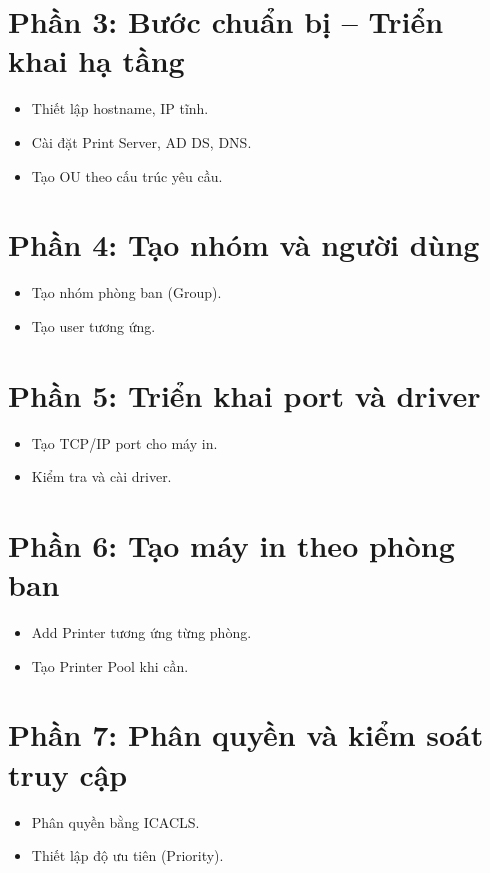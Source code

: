 
\section*{Phần 3: Bước chuẩn bị – Triển khai hạ tầng}
\begin{itemize}
    \item Thiết lập hostname, IP tĩnh.
    \item Cài đặt Print Server, AD DS, DNS.
    \item Tạo OU theo cấu trúc yêu cầu.
\end{itemize}

\section*{Phần 4: Tạo nhóm và người dùng}
\begin{itemize}
    \item Tạo nhóm phòng ban (Group).
    \item Tạo user tương ứng.
\end{itemize}

\section*{Phần 5: Triển khai port và driver}
\begin{itemize}
    \item Tạo TCP/IP port cho máy in.
    \item Kiểm tra và cài driver.
\end{itemize}

\section*{Phần 6: Tạo máy in theo phòng ban}
\begin{itemize}
    \item Add Printer tương ứng từng phòng.
    \item Tạo Printer Pool khi cần.
\end{itemize}

\section*{Phần 7: Phân quyền và kiểm soát truy cập}
\begin{itemize}
    \item Phân quyền bằng ICACLS.
    \item Thiết lập độ ưu tiên (Priority).
\end{itemize}


